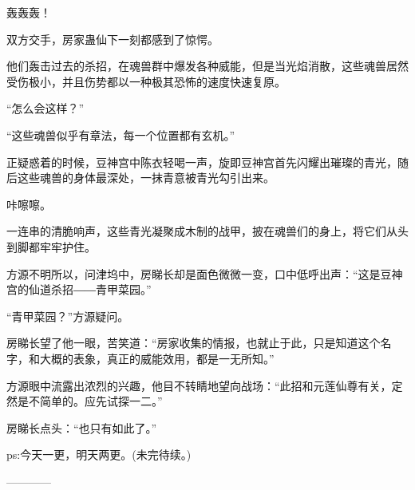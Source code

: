 \begin{this_body}
轰轰轰！

双方交手，房家蛊仙下一刻都感到了惊愕。

他们轰击过去的杀招，在魂兽群中爆发各种威能，但是当光焰消散，这些魂兽居然受伤极小，并且伤势都以一种极其恐怖的速度快速复原。

“怎么会这样？”

“这些魂兽似乎有章法，每一个位置都有玄机。”

正疑惑着的时候，豆神宫中陈衣轻喝一声，旋即豆神宫首先闪耀出璀璨的青光，随后这些魂兽的身体最深处，一抹青意被青光勾引出来。

咔嚓嚓。

一连串的清脆响声，这些青光凝聚成木制的战甲，披在魂兽们的身上，将它们从头到脚都牢牢护住。

方源不明所以，问津坞中，房睇长却是面色微微一变，口中低呼出声：“这是豆神宫的仙道杀招――青甲菜园。”

“青甲菜园？”方源疑问。

房睇长望了他一眼，苦笑道：“房家收集的情报，也就止于此，只是知道这个名字，和大概的表象，真正的威能效用，都是一无所知。”

方源眼中流露出浓烈的兴趣，他目不转睛地望向战场：“此招和元莲仙尊有关，定然是不简单的。应先试探一二。”

房睇长点头：“也只有如此了。”

ps:今天一更，明天两更。(未完待续。)

------------

\end{this_body}

